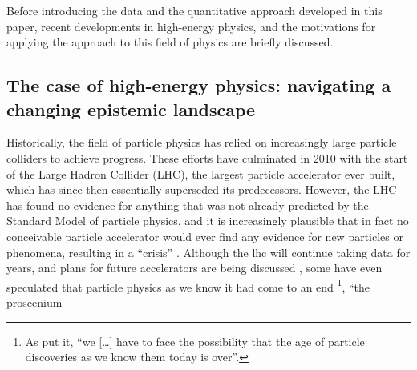 \documentclass{article}
\begin{document}
Before introducing the data and the quantitative approach developed in this paper, recent developments in high-energy physics, and the motivations for applying the approach to this field of physics are briefly discussed. 




\subsection{\label{sec:hep}The case of high-energy physics: navigating a changing epistemic landscape}

Historically, the field of particle physics has relied on increasingly large particle colliders to achieve progress. These efforts have culminated in 2010 with the start of the Large Hadron Collider (LHC), the largest particle accelerator ever built, which has since then essentially superseded its predecessors. However, the LHC has found no evidence for anything that was not already predicted by the Standard Model of particle physics, and it is increasingly plausible that in fact no conceivable particle accelerator would ever find any evidence for new particles or phenomena, resulting in a ``crisis'' \citep{susy_crisis}. Although the \gls{lhc} will continue taking data for years, and plans for future accelerators are being discussed \citep{Roser2023}, some have even speculated that particle physics as we know it had come to an end \citep{Harlander2023,Kosyakov2023}\footnote{As \citet{Harlander2023} put it, ``we [\dots] have to face the possibility that the age of particle discoveries as we know them today is over''.}, ``the proscenium
\end{document}
